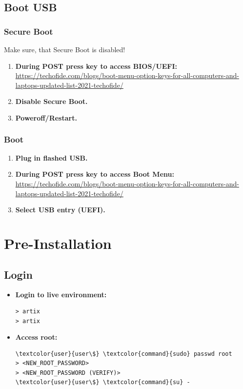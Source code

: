 \documentclass[10pt, a4paper, onecolumn, oneside, titlepage, openany]{book}
\begin{document}
\section{Boot USB}
\subsection{Secure Boot}
Make sure, that Secure Boot is disabled!
\begin{enumerate}
    \item \textbf{During POST press key to access BIOS/UEFI:}
\newline \href{https://techofide.com/blogs/boot-menu-option-keys-for-all-computers-and-laptops-updated-list-2021-techofide/}{https://techofide.com/blogs/boot-menu-option-keys-for-all-computers-and-laptops-updated-list-2021-techofide/}
    \item \textbf{Disable Secure Boot.}
    \item \textbf{Poweroff/Restart.}
\end{enumerate}
\subsection{Boot}
\begin{enumerate}
    \item \textbf{Plug in flashed USB.}
    \item \textbf{During POST press key to access Boot Menu:}
\newline \href{https://techofide.com/blogs/boot-menu-option-keys-for-all-computers-and-laptops-updated-list-2021-techofide/}{https://techofide.com/blogs/boot-menu-option-keys-for-all-computers-and-laptops-updated-list-2021-techofide/}
    \item \textbf{Select USB entry (UEFI).}
\end{enumerate}


\chapter{Pre-Installation}
\section{Login}
\begin{itemize}
    \item \textbf{Login to live environment:}
\begin{Verbatim}[commandchars=\\\{\}]
> artix
> artix
\end{Verbatim}
    \item \textbf{Access root:}
\begin{Verbatim}[commandchars=\\\{\}]
\textcolor{user}{user\$} \textcolor{command}{sudo} passwd root
> <NEW_ROOT_PASSWORD>
> <NEW_ROOT_PASSWORD (VERIFY)>
\textcolor{user}{user\$} \textcolor{command}{su} -
\end{Verbatim}
\end{itemize}
\end{document}
